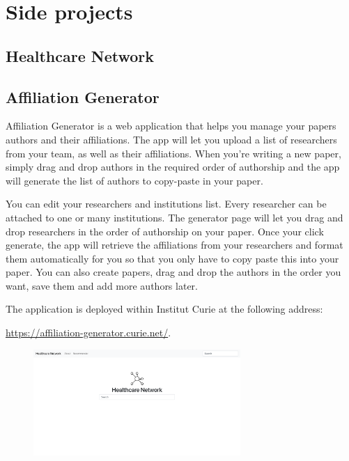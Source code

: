 \chapter{Side projects}

\section{Healthcare Network}

\section{Affiliation Generator}

Affiliation Generator is a web application that helps you manage your papers authors and their affiliations. The app will let you upload a list of researchers from your team, as well as their affiliations. When you're writing a new paper, simply drag and drop authors in the required order of authorship and the app will generate the list of authors to copy-paste in your paper.

You can edit your researchers and institutions list. Every researcher can be attached to one or many institutions. The generator page will let you drag and drop researchers in the order of authorship on your paper. Once your click generate, the app will retrieve the affiliations from your researchers and format them automatically for you so that you only have to copy paste this into your paper. You can also create papers, drag and drop the authors in the order you want, save them and add more authors later.

The application is deployed within Institut Curie at the following address:

\url{https://affiliation-generator.curie.net/}.

\begin{figure}[H]
    \includegraphics[width=0.7\textwidth]{images/healthcare-network/home.png}
    \centering
    \caption{}
    \label{fig:hn-home}
\end{figure}


